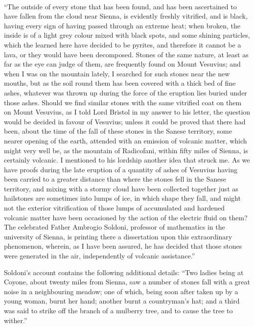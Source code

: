 \documentclass[a4paper, 12pt, oneside]{article}
\begin{document}
\paragraph{}
``The outside of every stone that has been found, and has been ascertained to have fallen from the cloud near Sienna, is evidently freshly vitrified, and is black, having every sign of having passed through an extreme heat; when broken, the inside is of a light grey colour mixed with black spots, and some shining particles, which the learned here have decided to be pyrites, and therefore it cannot be a lava, or they would have been decomposed. Stones of the same nature, at least as far as the eye can judge of them, are frequently found on Mount Vesuvius; and when I was on the mountain lately, I searched for such stones near the new mouths, but as the soil round them has been covered with a thick bed of fine ashes, whatever was thrown up during the force of the eruption lies buried under those ashes. Should we find similar stones with the same vitrified coat on them on Mount Vesuvius, as I told Lord Bristol in my answer to his letter, the question would be decided in favour of Vesuvius; unless it could be proved that there had been, about the time of the fall of these stones in the Sanese territory, some nearer opening of the earth, attended with an emission of volcanic matter, which might very well be, as the mountain of Radicofani, within fifty miles of Sienna, is certainly volcanic. I mentioned to his lordship another idea that struck me. As we have proofs during the late eruption of a quantity of ashes of Vesuvius having been carried to a greater distance than where the stones fell in the Sanese territory, and mixing with a stormy cloud have been collected together just as hailstones are sometimes into lumps of ice, in which shape they fall, and might not the exterior vitrification of those lumps of accumulated and hardened volcanic matter have been occasioned by the action of the electric fluid on them? The celebrated Father Ambrogio Soldoni, professor of mathematics in the university of Sienna, is printing there a dissertation upon this extraordinary phenomenon, wherein, as I have been assured, he has decided that those stones were generated in the air, independently of volcanic assistance.'' 

Soldoni's account contains the following additional details: ``Two ladies being at Coyone, about twenty miles from Sienna, saw a number of stones fall with a great noise in a neighbouring meadow; one of which, being soon after taken up by a young woman, burnt her hand; another burnt a countryman's hat; and a third was said to strike off the branch of a mulberry tree, and to cause the tree to wither.''
\end{document}
